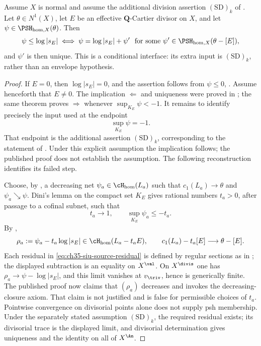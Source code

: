 \begin{theorem}
\label{thm:ch35-homogeneous-siu-general}
Assume $X$ is normal and assume the additional division assertion
$\mathrm{(SD)}_k$ of . Let
$\theta\in N^1(X)$, let $E$ be an effective $\mathbf Q$-Cartier divisor
on $X$, and let $\psi\in\PSH_{\mathrm{hom},X}(\theta)$. Then
\begin{equation}
\label{eq:ch35-homogeneous-siu-general}
 \psi\leq\log|s_E|
 \iff
 \psi=\log|s_E|+\psi'\ \text{ for some }
 \psi'\in\PSH_{\mathrm{hom},X}(\theta-[E]),
\end{equation}
and $\psi'$ is then unique. This is a conditional interface: its extra
input is $\mathrm{(SD)}_k$, rather than an envelope hypothesis.
\end{theorem}

\begin{proof}
If $E=0$, then $\log|s_E|=0$, and the assertion follows from
$\psi\leq0$, .  Assume henceforth
that $E\neq0$.  The implication $\Leftarrow$ and uniqueness were proved
in ; the same theorem proves
$\Rightarrow$ whenever
$\sup_{K_E}\psi<-1$.  It remains to identify precisely the input used at
the endpoint
\begin{equation}
\label{eq:ch35-siu-critical-sup}
 \sup_{K_E}\psi=-1.
\end{equation}
That endpoint is the additional assertion $\mathrm{(SD)}_k$, corresponding
to the statement of \cite[Theorem~6.21]{BJ22}. Under this explicit
assumption the implication follows; the published proof does not establish
the assumption. The following reconstruction identifies its failed step.

Choose, by , a decreasing net
$\psi_a\in\cH_{\mathrm{hom}}(L_a)$ such that
$c_1(L_a)\to\theta$ and $\psi_a\searrow\psi$.  Dini's lemma on the
compact set $K_E$ gives rational numbers $t_a>0$, after passage to a
cofinal subnet, such that
\begin{equation}
\label{eq:ch35-siu-source-ta}
 t_a\longrightarrow1,
 \qquad
 \sup_{K_E}\psi_a\leq-t_a.
\end{equation}
By ,
\begin{equation}
\label{eq:ch35-siu-source-residual}
 \rho_a:=\psi_a-t_a\log|s_E|
 \in\cH_{\mathrm{hom}}(L_a-t_aE),
 \qquad
 c_1(L_a)-t_a[E]\longrightarrow\theta-[E].
\end{equation}
Each residual in \eqref{eq:ch35-siu-source-residual} is defined by
regular sections as in ; the displayed
subtraction is an equality on $X^{\val}$. On $X^{\divis}$ one has
$\rho_a\to\psi-\log|s_E|$, and this limit vanishes at
$v_{\triv}$, hence is generically finite.  The published proof now claims that $(\rho_a)$ decreases and invokes
the decreasing-closure axiom. That claim is not justified and is false
for permissible choices of $t_a$. Pointwise convergence on divisorial
points alone does not supply psh membership. Under the separately stated
assumption $\mathrm{(SD)}_k$, the required residual exists; its divisorial
trace is the displayed limit, and divisorial determination gives uniqueness
and the identity on all of $X^{\An}$.


\end{proof}

